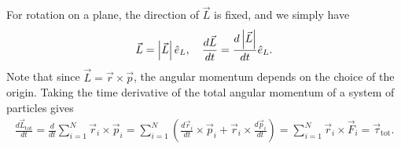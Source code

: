 For rotation on a plane, the direction of $\vec{L}$ is fixed, and we simply have
\begin{align}
    \vec{L} = \left| \vec{L} \right| \hat{e}_{L},\quad \frac{d\vec{L}}{dt} = \frac{d\left| \vec{L} \right|}{dt} \hat{e}_{L}.
\end{align}
Note that since $\vec{L} = \vec{r} \times \vec{p}$, the angular momentum depends on the choice of the origin. Taking the time derivative of the total angular momentum of a system of particles gives
\begin{align}
    \frac{d\vec{L}_{\text{tot}}}{dt} = \frac{d}{dt} \sum_{i=1}^{N} \vec{r}_{i} \times \vec{p}_{i} = \sum_{i=1}^{N} \left(\frac{d \vec{r}_{i}}{dt} \times \vec{p}_{i}+ \vec{r}_{i} \times \frac{d \vec{p}_{i}}{dt} \right) = \sum_{i=1}^{N} \vec{r}_{i} \times \vec{F}_{i} = \vec{\tau}_{\text{tot}}.
\end{align}

